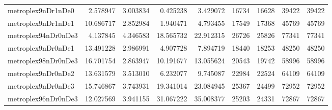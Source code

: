 \begin{longtable}{|l|r|r|r|r|r|r|r|r|}
metroplex9nDr1nDe0 & 2.578947 & 3.003834 & 0.425238 & 3.429072 & 16734 & 16628 & 39422 & 39422 \\
metroplex9nDr1nDe1 & 10.686717 & 2.852984 & 1.940471 & 4.793455 & 17549 & 17368 & 45769 & 45769 \\
metroplex94nDr0nDe3 & 4.137845 & 4.346583 & 18.565732 & 22.912315 & 26726 & 25826 & 77341 & 77341 \\
metroplex9nDr0nDe1 & 13.491228 & 2.986991 & 4.907728 & 7.894719 & 18440 & 18253 & 48250 & 48250 \\
metroplex98nDr0nDe3 & 16.701754 & 2.863947 & 10.191677 & 13.055624 & 20543 & 19742 & 58996 & 58996 \\
metroplex9nDr0nDe2 & 13.631579 & 3.513010 & 6.232077 & 9.745087 & 22984 & 22524 & 64109 & 64109 \\
metroplex9nDr0nDe3 & 15.746867 & 3.743931 & 19.341014 & 23.084945 & 25367 & 24499 & 72952 & 72952 \\
metroplex96nDr0nDe3 & 12.027569 & 3.941155 & 31.067222 & 35.008377 & 25203 & 24331 & 72867 & 72867 \\
\end{longtable}
